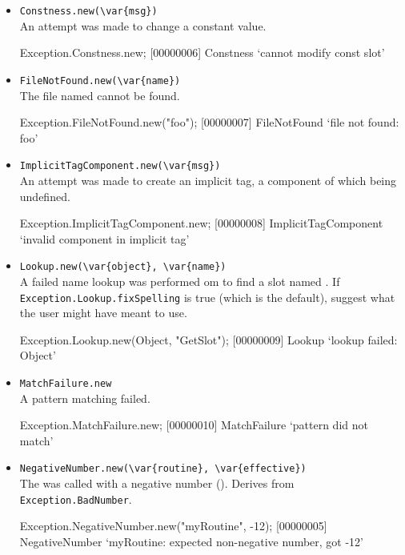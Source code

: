 \begin{itemize}
\item \lstinline|Constness.new(\var{msg})|\\
  An attempt was made to change a constant value.
\begin{urbiscript}[firstnumber=last]
Exception.Constness.new;
[00000006] Constness `cannot modify const slot'
\end{urbiscript}

\item \lstinline|FileNotFound.new(\var{name})|\\
  The file named  cannot be found.
\begin{urbiscript}[firstnumber=last]
Exception.FileNotFound.new("foo");
[00000007] FileNotFound `file not found: foo'
\end{urbiscript}

\item \lstinline|ImplicitTagComponent.new(\var{msg})|\\
  An attempt was made to create an implicit tag, a component of which
  being undefined.
\begin{urbiscript}[firstnumber=last]
Exception.ImplicitTagComponent.new;
[00000008] ImplicitTagComponent `invalid component in implicit tag'
\end{urbiscript}

\item \lstinline|Lookup.new(\var{object}, \var{name})|\\
  A failed name lookup was performed om  to find a slot
  named .  If \lstinline|Exception.Lookup.fixSpelling| is
  true (which is the default), suggest what the user might have meant
  to use.
\begin{urbiscript}[firstnumber=last]
Exception.Lookup.new(Object, "GetSlot");
[00000009] Lookup `lookup failed: Object'
\end{urbiscript}

\item \lstinline|MatchFailure.new|\\
  A pattern matching failed.
\begin{urbiscript}[firstnumber=last]
Exception.MatchFailure.new;
[00000010] MatchFailure `pattern did not match'
\end{urbiscript}

\item \lstinline|NegativeNumber.new(\var{routine}, \var{effective})|\\
  The  was called with a negative number
  ().  Derives from \lstinline|Exception.BadNumber|.
\begin{urbiscript}[firstnumber=last]
Exception.NegativeNumber.new("myRoutine", -12);
[00000005] NegativeNumber `myRoutine: expected non-negative number, got -12'
\end{urbiscript}


\end{itemize}
